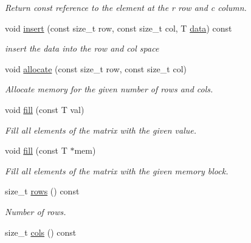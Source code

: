 \begin{DoxyCompactItemize}
\begin{DoxyCompactList}\small\item\em Return const reference to the element at the r row and c column. \end{DoxyCompactList}\item 
void \hyperlink{classanpi_1_1Matrix_a3cfc6c7134e51144233c27277577dbd1}{insert} (const size\+\_\+t row, const size\+\_\+t col, T \hyperlink{classanpi_1_1Matrix_ad620d822fefc019cef07f4c1fb1c7052}{data}) const 
\begin{DoxyCompactList}\small\item\em insert the data into the row and col space \end{DoxyCompactList}\item 
void \hyperlink{classanpi_1_1Matrix_ac3ac962e6058ef48b58e654e4ea7ed65}{allocate} (const size\+\_\+t row, const size\+\_\+t col)\hypertarget{classanpi_1_1Matrix_ac3ac962e6058ef48b58e654e4ea7ed65}{}\label{classanpi_1_1Matrix_ac3ac962e6058ef48b58e654e4ea7ed65}

\begin{DoxyCompactList}\small\item\em Allocate memory for the given number of rows and cols. \end{DoxyCompactList}\item 
void \hyperlink{classanpi_1_1Matrix_ad7b7f6f61d23ae8ccd7e3a19e82a8c63}{fill} (const T val)\hypertarget{classanpi_1_1Matrix_ad7b7f6f61d23ae8ccd7e3a19e82a8c63}{}\label{classanpi_1_1Matrix_ad7b7f6f61d23ae8ccd7e3a19e82a8c63}

\begin{DoxyCompactList}\small\item\em Fill all elements of the matrix with the given value. \end{DoxyCompactList}\item 
void \hyperlink{classanpi_1_1Matrix_a2df6d413691d4aa8d0e958eb74ee394b}{fill} (const T $\ast$mem)
\begin{DoxyCompactList}\small\item\em Fill all elements of the matrix with the given memory block. \end{DoxyCompactList}\item 
size\+\_\+t \hyperlink{classanpi_1_1Matrix_a4b786272497d9f67f120a226c1bfcff4}{rows} () const \hypertarget{classanpi_1_1Matrix_a4b786272497d9f67f120a226c1bfcff4}{}\label{classanpi_1_1Matrix_a4b786272497d9f67f120a226c1bfcff4}

\begin{DoxyCompactList}\small\item\em Number of rows. \end{DoxyCompactList}\item 
size\+\_\+t \hyperlink{classanpi_1_1Matrix_a5bd9f2fe255fe0390bfe880877222b2a}{cols} () const \hypertarget{classanpi_1_1Matrix_a5bd9f2fe255fe0390bfe880877222b2a}{}\label{classanpi_1_1Matrix_a5bd9f2fe255fe0390bfe880877222b2a}


\end{DoxyCompactItemize}
